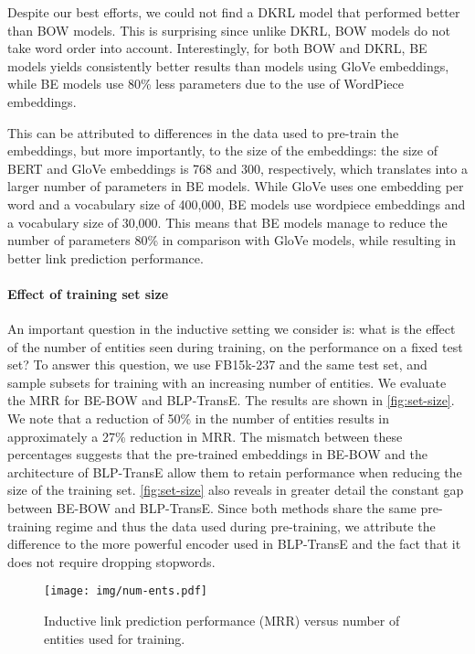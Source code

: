 \documentclass[sigconf]{acmart}
\begin{document}
Despite our best efforts, we could not find a DKRL model that performed better than BOW models. This is surprising since unlike DKRL, BOW models do not take word order into account. Interestingly, for both BOW and DKRL, BE models yields consistently better results than models using GloVe embeddings, while BE models use 80\% less parameters due to the use of WordPiece embeddings.

This can be attributed to differences in the data used to pre-train the embeddings, but more importantly, to the size of the embeddings: the size of BERT and GloVe embeddings is 768 and 300, respectively, which translates into a larger number of parameters in BE models. While GloVe uses one embedding per word and a vocabulary size of 400,000, BE models use wordpiece embeddings and a vocabulary size of 30,000. This means that BE models manage to reduce the number of parameters 80\% in comparison with GloVe models, while resulting in better link prediction performance.

\paragraph{Effect of training set size} An important question in the inductive setting we consider is: what is the effect of the number of entities seen during training, on the performance on a fixed test set? To answer this question, we use FB15k-237 and the same test set, and sample subsets for training with an increasing number of entities. We evaluate the MRR for BE-BOW and BLP-TransE. The results are shown in \autoref{fig:set-size}. We note that a reduction of 50\% in the number of entities results in approximately a 27\% reduction in MRR. The mismatch between these percentages suggests that the pre-trained embeddings in BE-BOW and the architecture of BLP-TransE allow them to retain performance when reducing the size of the training set. \autoref{fig:set-size} also reveals in greater detail the constant gap between BE-BOW and BLP-TransE. Since both methods share the same pre-training regime and thus the data used during pre-training, we attribute the difference to the more powerful encoder used in BLP-TransE and the fact that it does not require dropping stopwords.

\begin{figure}[t]
    \centering
    \texttt{[image: img/num-ents.pdf]}
    \caption{Inductive link prediction performance (MRR) versus number of entities used for training.}
    \label{fig:set-size}
\end{figure}
\end{document}
